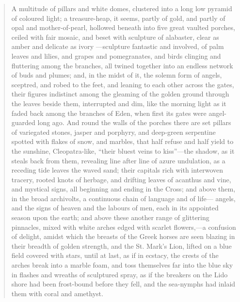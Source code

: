 


\begin{quote}
A multitude of pillars and white domes, clustered into a long low
pyramid of coloured light; a treasure-heap, it seems, partly of gold,
and partly of opal and mother-of-pearl, hollowed beneath into five
great vaulted porches, ceiled with fair mosaic, and beset with
sculpture of alabaster, clear as amber and delicate as ivory —sculpture
fantastic and involved, of palm leaves and lilies, and grapes and
pomegranates, and birds clinging and fluttering among the branches, all
twined together into an endless network of buds and plumes; and, in the
midst of it, the solemn form of angels, sceptred, and robed to the
feet, and leaning to each other across the gates, their figures
indistinct among the gleaming of the golden ground through the leaves
beside them, interrupted and dim, like the morning light as it faded
back among the branches of Eden, when first its gates were
angel-guarded long ago.  And round the walls of the porches there are
set pillars of variegated stones, jasper and porphyry, and deep-green
serpentine spotted with flakes of snow, and marbles, that half refuse
and half yield to the sunshine, Cleopatra-like, ``their
bluest veins to kiss''---the shadow, as it steals back from
them, revealing line after line of azure undulation, as a receding tide
leaves the waved sand; their capitals rich with interwoven tracery,
rooted knots of herbage, and drifting leaves of acanthus and vine, and
mystical signs, all beginning and ending in the Cross; and above them,
in the broad archivolts, a continuous chain of language and of life—
angels, and the signs of heaven and the labours of men, each in its
appointed season upon the earth; and above these another range of
glittering pinnacles, mixed with white arches edged with scarlet
flowers,—a confusion of delight, amidst which the breasts of the Greek
horses are seen blazing in their breadth of golden strength, and the
St. Mark's Lion, lifted on a blue field covered with
stars, until at last, as if in ecstacy, the crests of the arches break
into a marble foam, and toss themselves far into the blue sky in
flashes and wreaths of sculptured spray, as if the breakers on the Lido
shore had been frost-bound before they fell, and the sea-nymphs had
inlaid them with coral and amethyst.  \citep[][vol. 2, ch. 4, sec. 14]{ruskin1885}
\end{quote}

